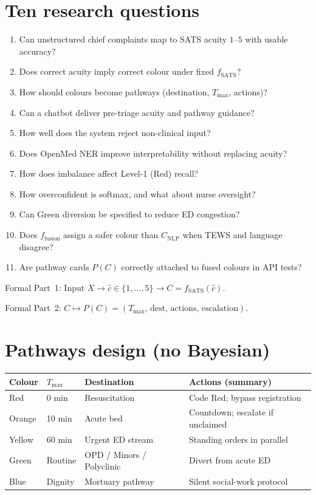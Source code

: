 \documentclass[11pt,a4paper]{article}
\begin{document}
\section{Ten research questions}
\begin{enumerate}
  \item[\textbf{RQ1}] Can unstructured chief complaints map to SATS acuity $1$--$5$ with usable accuracy?
  \item[\textbf{RQ2}] Does correct acuity imply correct colour under fixed $f_{\mathrm{SATS}}$?
  \item[\textbf{RQ3}] How should colours become pathways (destination, $T_{\max}$, actions)?
  \item[\textbf{RQ4}] Can a chatbot deliver pre-triage acuity and pathway guidance?
  \item[\textbf{RQ5}] How well does the system reject non-clinical input?
  \item[\textbf{RQ6}] Does OpenMed NER improve interpretability without replacing acuity?
  \item[\textbf{RQ7}] How does imbalance affect Level-1 (Red) recall?
  \item[\textbf{RQ8}] How overconfident is softmax, and what about nurse oversight?
  \item[\textbf{RQ9}] Can Green diversion be specified to reduce ED congestion?
  \item[\textbf{RQ10}] Does $f_{\mathrm{fusion}}$ assign a safer colour than $C_{\mathrm{NLP}}$ when TEWS and language disagree?
  \item[\textbf{RQ11}] Are pathway cards $P(C)$ correctly attached to fused colours in API tests?
\end{enumerate}

Formal Part~1: $\text{Input } X \to \hat{c}\in\{1,\ldots,5\} \to C=f_{\mathrm{SATS}}(\hat{c})$.

Formal Part~2: $C \mapsto P(C)=(T_{\max},\,\mathrm{dest},\,\mathrm{actions},\,\mathrm{escalation})$.

\section{Pathways design (no Bayesian)}
\begin{tabular}{@{}p{1.8cm}p{2cm}p{3.5cm}p{5.5cm}@{}}
\toprule
Colour & $T_{\max}$ & Destination & Actions (summary) \\
\midrule
Red & 0 min & Resuscitation & Code Red; bypass registration \\
Orange & 10 min & Acute bed & Countdown; escalate if unclaimed \\
Yellow & 60 min & Urgent ED stream & Standing orders in parallel \\
Green & Routine & OPD / Minors / Polyclinic & Divert from acute ED \\
Blue & Dignity & Mortuary pathway & Silent social-work protocol \\
\bottomrule
\end{tabular}
\end{document}
